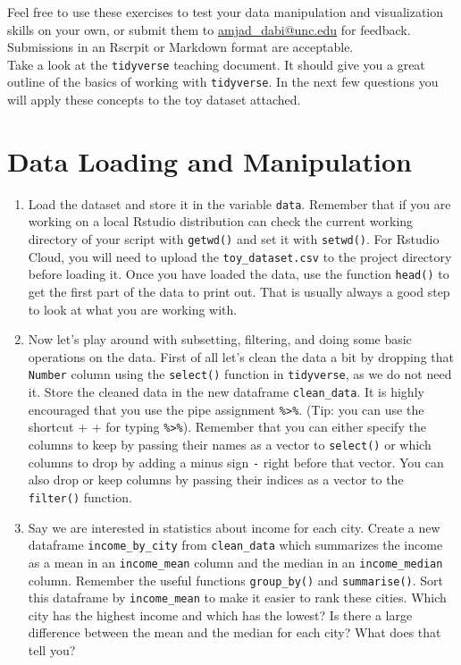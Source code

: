 \documentclass[]{article}
\begin{document}
	
Feel free to use these exercises to test your data manipulation and visualization skills on your own, or submit them to \url{amjad_dabi@unc.edu} for feedback. Submissions in an Rscrpit or Markdown format are acceptable. 
\\

Take a look at the \verb|tidyverse| teaching document. It should give you a great outline of the basics of working with \verb|tidyverse|. In the next few questions you will apply these concepts to the toy dataset attached.

	\section*{Data Loading and Manipulation}
	\begin{enumerate}
		\item 
		Load the dataset and store it in the variable \verb|data|. Remember that if you are working on a local Rstudio distribution can check the current working directory of your script with \verb|getwd()| and set it with \verb|setwd()|. For Rstudio Cloud, you will need to upload the \verb|toy_dataset.csv| to the project directory before loading it. Once you have loaded the data, use the function \verb|head()| to get the first part of the data to print out. That is usually always a good step to look at what you are working with.
		
		\item
		
		Now let's play around with subsetting, filtering, and doing some basic operations on the data. First of all let's clean the data a bit by dropping that \verb|Number| column using the \verb|select()| function in \verb|tidyverse|, as we do not need it. Store the cleaned data in the new dataframe \verb|clean_data|. It is highly encouraged that you use the pipe assignment \verb|%>%|. (Tip: you can use the shortcut \Ctrl + \Shift +  for typing \verb|%>%|). Remember that you can either specify the columns to keep by passing their names as a vector to \verb|select()| or which columns to drop by adding a minus sign \verb|-| right before that vector. You can also drop or keep columns by passing their indices as a vector to the \verb|filter()| function. 
		
		\item
		Say we are interested in statistics about income for each city. Create a new dataframe \verb|income_by_city| from \verb|clean_data| which summarizes the income as a mean in an \verb|income_mean| column and the median in an \verb|income_median| column. Remember the useful functions \verb|group_by()| and \verb|summarise()|. Sort this dataframe by \verb|income_mean| to make it easier to rank these cities. Which city has the highest income and which has the lowest? Is there a large difference between the mean and the median for each city? What does that tell you?
		

\end{enumerate}
\end{document}

